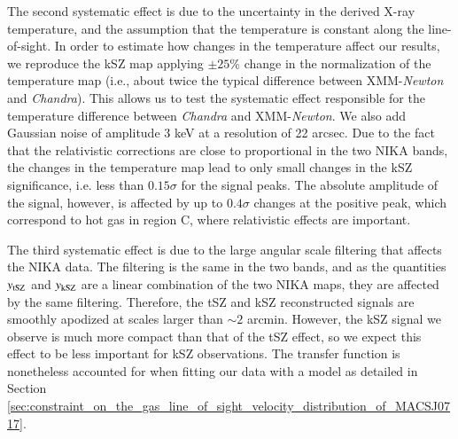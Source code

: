 \documentclass[twocolumn,traditabstract]{aa}
\begin{document}
The second systematic effect is due to the uncertainty in the derived X-ray temperature, and the assumption that the temperature is constant along the line-of-sight. In order to estimate how changes in the temperature affect our results, we reproduce the kSZ map applying $\pm 25$\% change in the normalization of the temperature map (i.e., about twice the typical difference between XMM-\textit{Newton} and \textit{Chandra}). This allows us to test the systematic effect responsible for the temperature difference between \textit{Chandra} and XMM-\textit{Newton}. We also add Gaussian noise of amplitude 3 keV at a resolution of 22 arcsec. Due to the fact that the relativistic corrections are close to proportional in the two NIKA bands, the changes in the temperature map lead to only small changes in the kSZ significance, i.e. less than $0.15 \sigma$ for the signal peaks. The absolute amplitude of the signal, however, is affected by up to $0.4 \sigma$ changes at the positive peak, which correspond to hot gas in region C, where relativistic effects are important.

The third systematic effect is due to the large angular scale filtering that affects the NIKA data. The filtering is the same in the two bands, and as the quantities $y_{\rm tSZ}$ and $y_{\rm kSZ}$ are a linear combination of the two NIKA maps, they are affected by the same filtering. Therefore, the tSZ and kSZ reconstructed signals are smoothly apodized at scales larger than $\sim 2$ arcmin. However, the kSZ signal we observe is much more compact than that of the tSZ effect, so we expect this effect to be less important for kSZ observations. The transfer function is nonetheless accounted for when fitting our data with a model as detailed in Section \ref{sec:constraint_on_the_gas_line_of_sight_velocity_distribution_of_MACSJ0717}.

\end{document}
